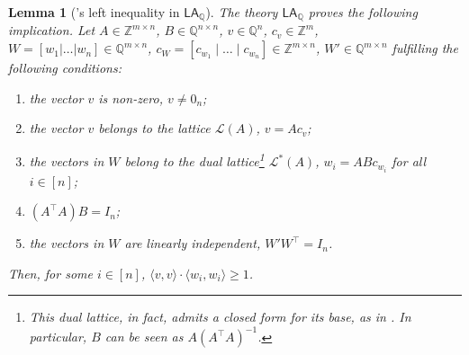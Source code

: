 \documentclass[11pt]{article}
\newcommand{\LAQ}{\mathsf{LA}_\mathbb{Q}}
\theoremstyle{definition}
\theoremstyle{plain}
\newtheorem{lemma}[definition]{Lemma}
\theoremstyle{remark}
\newcommand{\LL}{\mathcal{L}}
\newcommand{\bZ}{\mathbb{Z}}
\newcommand{\bQ}{\mathbb{Q}}
\begin{document}
\begin{lemma}[\citeauthor{banaszczyk1993new}'s left inequality in $\LAQ$]
\label{lem:lwb-LAQ}
The theory $\LAQ$ proves the following implication. Let $A \in\mathbb{Z}^{m\times n}$, $B \in \bQ^{n\times n}$, $v \in \bQ^n$, $c_v \in \bZ^m$,  $W =[w_1|\dots|w_n]\in \mathbb{Q}^{m\times n}$, $c_{W} = [c_{w_1} \mid \dots \mid c_{w_n}] \in \mathbb{Z}^{m\times n}$, $W' \in \bQ^{m \times n}$ fulfilling the following conditions:

\begin{enumerate}
    \item the vector $v$ is non-zero, $v\neq 0_n$;
    \item the vector $v$ belongs to the lattice $\LL(A)$, $v = Ac_v$;
    \item the vectors in $W$ belong to the dual lattice\footnote{This dual lattice, in fact, admits a closed form for its base, as in . In particular, $B$ can be seen as $A(A^\intercal A)^{-1}$.} $\LL^*(A)$, $w_i = ABc_{w_i}$ for all $i \in [n]$;
    \item $(A^\intercal A)B = I_n$;
    \item the vectors in $W$ are linearly independent, $W'W^\intercal = I_n$.
\end{enumerate}
Then, for some $i \in [n]$, $\langle v ,v\rangle\cdot\langle w_i,w_i\rangle\geq 1 $.
\end{lemma}
\end{document}
